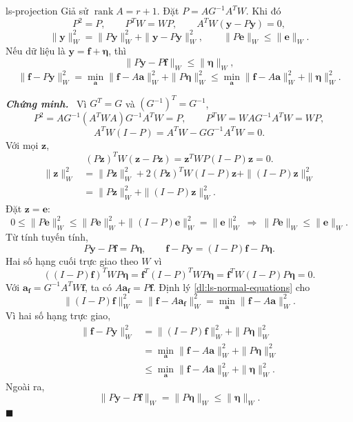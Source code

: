 \documentclass[12pt,a4paper,oneside]{book}
\numberwithin{algorithm}{chapter}
\theoremstyle{definition}
\newenvironment{chungminh}{\par\medskip\noindent\textbf{\textit{\color{mainblue}Chứng minh.}}\ }{\hfill$\blacksquare$\par\medskip}
\begin{document}
\begin{menhde}{}{ls-projection}
Giả sử $\operatorname{rank}A=r+1$. Đặt $P=AG^{-1}A^TW$. Khi đó
\[
 P^2=P,\qquad P^TW=WP,\qquad A^TW(\mathbf y-P\mathbf y)=0,
\]
\[
 \|\mathbf y\|_W^2=\|P\mathbf y\|_W^2+\|\mathbf y-P\mathbf y\|_W^2,
 \qquad\|P\mathbf e\|_W\leq\|\mathbf e\|_W.
\]
Nếu dữ liệu là $\mathbf y=\mathbf f+\boldsymbol\eta$, thì
\[
 \|P\mathbf y-P\mathbf f\|_W\leq\|\boldsymbol\eta\|_W,
\]
\begin{equation}\label{eq:ls-approx-noise}
 \|\mathbf f-P\mathbf y\|_W^2
 =\min_{\mathbf a}\|\mathbf f-A\mathbf a\|_W^2+\|P\boldsymbol\eta\|_W^2
 \leq\min_{\mathbf a}\|\mathbf f-A\mathbf a\|_W^2+\|\boldsymbol\eta\|_W^2.
\end{equation}
\end{menhde}
\begin{chungminh}
Vì $G^T=G$ và $(G^{-1})^T=G^{-1}$,
\[
 P^2=AG^{-1}(A^TWA)G^{-1}A^TW=P,\qquad
 P^TW=WA G^{-1}A^TW=WP,
\]
\[
 A^TW(I-P)=A^TW-GG^{-1}A^TW=0.
\]
Với mọi $\mathbf z$,
\[
 (P\mathbf z)^TW(\mathbf z-P\mathbf z)
 =\mathbf z^TWP(I-P)\mathbf z=0.
\]
\begin{align*}
 \|\mathbf z\|_W^2
 &=\|P\mathbf z\|_W^2
 +2(P\mathbf z)^TW(I-P)\mathbf z+\|(I-P)\mathbf z\|_W^2\\
 &=\|P\mathbf z\|_W^2+\|(I-P)\mathbf z\|_W^2.
\end{align*}
Đặt $\mathbf z=\mathbf e$:
\[
 0\leq\|P\mathbf e\|_W^2
 \leq\|P\mathbf e\|_W^2+\|(I-P)\mathbf e\|_W^2
 =\|\mathbf e\|_W^2
 \ \Longrightarrow\ \|P\mathbf e\|_W\leq\|\mathbf e\|_W.
\] Từ tính tuyến tính,
\[
 P\mathbf y-P\mathbf f=P\boldsymbol\eta,
 \qquad\mathbf f-P\mathbf y=(I-P)\mathbf f-P\boldsymbol\eta.
\]
Hai số hạng cuối trực giao theo $W$ vì
\[
 ((I-P)\mathbf f)^TWP\boldsymbol\eta
 =\mathbf f^T(I-P)^TWP\boldsymbol\eta
 =\mathbf f^TW(I-P)P\boldsymbol\eta=0.
\]
Với $\mathbf a_{\mathbf f}=G^{-1}A^TW\mathbf f$, ta có $A\mathbf a_{\mathbf f}=P\mathbf f$. Định lý \ref{dl:ls-normal-equations} cho
\[
 \|(I-P)\mathbf f\|_W^2
 =\|\mathbf f-A\mathbf a_{\mathbf f}\|_W^2
 =\min_{\mathbf a}\|\mathbf f-A\mathbf a\|_W^2.
\]
Vì hai số hạng trực giao,
\begin{align*}
 \|\mathbf f-P\mathbf y\|_W^2
 &=\|(I-P)\mathbf f\|_W^2+\|P\boldsymbol\eta\|_W^2\\
 &=\min_{\mathbf a}\|\mathbf f-A\mathbf a\|_W^2+\|P\boldsymbol\eta\|_W^2\\
 &\leq\min_{\mathbf a}\|\mathbf f-A\mathbf a\|_W^2+\|\boldsymbol\eta\|_W^2.
\end{align*}
Ngoài ra,
\[
 \|P\mathbf y-P\mathbf f\|_W
 =\|P\boldsymbol\eta\|_W\leq\|\boldsymbol\eta\|_W.
\]
\end{chungminh}
\end{document}
